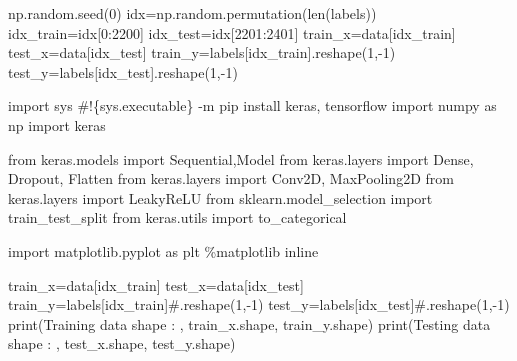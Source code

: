 \documentclass[
  letterpaper,
  DIV=11,
  numbers=noendperiod]{scrartcl}
\newenvironment{Shaded}{\begin{snugshade}}{\end{snugshade}}
\newcommand{\BuiltInTok}[1]{\textcolor[rgb]{0.00,0.23,0.31}{#1}}
\newcommand{\CommentTok}[1]{\textcolor[rgb]{0.37,0.37,0.37}{#1}}
\newcommand{\DecValTok}[1]{\textcolor[rgb]{0.68,0.00,0.00}{#1}}
\newcommand{\ImportTok}[1]{\textcolor[rgb]{0.00,0.46,0.62}{#1}}
\newcommand{\NormalTok}[1]{\textcolor[rgb]{0.00,0.23,0.31}{#1}}
\newcommand{\OperatorTok}[1]{\textcolor[rgb]{0.37,0.37,0.37}{#1}}
\newcommand{\StringTok}[1]{\textcolor[rgb]{0.13,0.47,0.30}{#1}}
\begin{document}
\begin{Shaded}
\begin{Highlighting}[]
\NormalTok{np.random.seed(}\DecValTok{0}\NormalTok{)}
\NormalTok{idx}\OperatorTok{=}\NormalTok{np.random.permutation(}\BuiltInTok{len}\NormalTok{(labels))}
\NormalTok{idx\_train}\OperatorTok{=}\NormalTok{idx[}\DecValTok{0}\NormalTok{:}\DecValTok{2200}\NormalTok{]}
\NormalTok{idx\_test}\OperatorTok{=}\NormalTok{idx[}\DecValTok{2201}\NormalTok{:}\DecValTok{2401}\NormalTok{]}
\NormalTok{train\_x}\OperatorTok{=}\NormalTok{data[idx\_train]}
\NormalTok{test\_x}\OperatorTok{=}\NormalTok{data[idx\_test]}
\NormalTok{train\_y}\OperatorTok{=}\NormalTok{labels[idx\_train].reshape(}\DecValTok{1}\NormalTok{,}\OperatorTok{{-}}\DecValTok{1}\NormalTok{)}
\NormalTok{test\_y}\OperatorTok{=}\NormalTok{labels[idx\_test].reshape(}\DecValTok{1}\NormalTok{,}\OperatorTok{{-}}\DecValTok{1}\NormalTok{)}
\end{Highlighting}
\end{Shaded}

\begin{Shaded}
\begin{Highlighting}[]
\ImportTok{import}\NormalTok{ sys}
\CommentTok{\#!\{sys.executable\} {-}m pip install keras, tensorflow}
\ImportTok{import}\NormalTok{ numpy }\ImportTok{as}\NormalTok{ np}
\ImportTok{import}\NormalTok{ keras}

\ImportTok{from}\NormalTok{ keras.models }\ImportTok{import}\NormalTok{ Sequential,Model}
\ImportTok{from}\NormalTok{ keras.layers }\ImportTok{import}\NormalTok{ Dense, Dropout, Flatten}
\ImportTok{from}\NormalTok{ keras.layers }\ImportTok{import}\NormalTok{ Conv2D, MaxPooling2D}
\ImportTok{from}\NormalTok{ keras.layers }\ImportTok{import}\NormalTok{ LeakyReLU}
\ImportTok{from}\NormalTok{ sklearn.model\_selection }\ImportTok{import}\NormalTok{ train\_test\_split}
\ImportTok{from}\NormalTok{ keras.utils }\ImportTok{import}\NormalTok{ to\_categorical}


\ImportTok{import}\NormalTok{ matplotlib.pyplot }\ImportTok{as}\NormalTok{ plt}
\OperatorTok{\%}\NormalTok{matplotlib inline}
\end{Highlighting}
\end{Shaded}

\begin{Shaded}
\begin{Highlighting}[]
\NormalTok{train\_x}\OperatorTok{=}\NormalTok{data[idx\_train]}
\NormalTok{test\_x}\OperatorTok{=}\NormalTok{data[idx\_test]}
\NormalTok{train\_y}\OperatorTok{=}\NormalTok{labels[idx\_train]}\CommentTok{\#.reshape(1,{-}1)}
\NormalTok{test\_y}\OperatorTok{=}\NormalTok{labels[idx\_test]}\CommentTok{\#.reshape(1,{-}1)}
\BuiltInTok{print}\NormalTok{(}\StringTok{\textquotesingle{}Training data shape : \textquotesingle{}}\NormalTok{, train\_x.shape, train\_y.shape)}
\BuiltInTok{print}\NormalTok{(}\StringTok{\textquotesingle{}Testing data shape : \textquotesingle{}}\NormalTok{, test\_x.shape, test\_y.shape)}
\end{Highlighting}
\end{Shaded}
\end{document}
